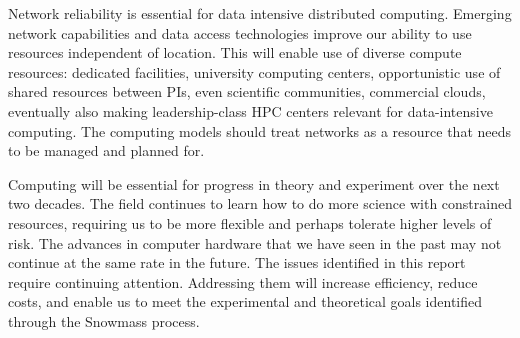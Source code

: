 Network reliability is essential for data intensive distributed computing.
Emerging network capabilities and data access technologies improve our
ability to use resources independent of location. This will enable use of
diverse compute resources: dedicated facilities, university computing
centers, opportunistic use of shared resources between PIs, even scientific
communities, commercial clouds, eventually also making leadership-class HPC
centers relevant for data-intensive computing. The computing models should
treat networks as a resource that needs to be managed and planned for.

Computing will be essential for progress in theory and experiment over the
next two decades. The field continues to learn how to do more science with
constrained resources, requiring us to be more flexible and perhaps tolerate
higher levels of risk. The advances in computer hardware that we have seen
in the past may not continue at the same rate in the future. The issues
identified in this report require continuing attention. Addressing them
will increase efficiency, reduce costs, and enable us to meet the
experimental and theoretical goals identified through the Snowmass process.
